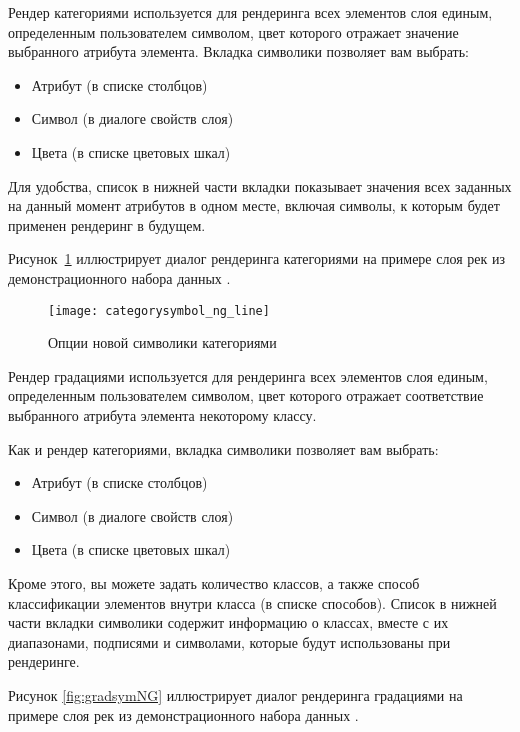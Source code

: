 
Рендер категориями используется для рендеринга всех элементов слоя единым,
определенным пользователем символом, цвет которого отражает значение выбранного
атрибута элемента. Вкладка символики позволяет вам выбрать:

\begin{itemize}[label=--]
\item Атрибут (в списке столбцов)
\item Символ (в диалоге свойств слоя)
\item Цвета (в списке цветовых шкал)
\end{itemize}

Для удобства, список в нижней части вкладки показывает значения всех заданных
на данный момент атрибутов в одном месте, включая символы, к которым
будет применен рендеринг в будущем.

Рисунок~\ref{fig:catsymNG} иллюстрирует диалог рендеринга категориями
на примере слоя рек из демонстрационного набора данных \qg.

\begin{figure}[ht]
   \centering
   \texttt{[image: categorysymbol\_ng\_line]}
   \caption{Опции новой символики категориями \wincaption}\label{fig:catsymNG}
\end{figure}


Рендер градациями используется для рендеринга всех элементов слоя единым,
определенным пользователем символом, цвет которого отражает соответствие
выбранного атрибута элемента некоторому классу.

Как и рендер категориями, вкладка символики позволяет вам выбрать:

\begin{itemize}[label=--]
\item Атрибут (в списке столбцов)
\item Символ (в диалоге свойств слоя)
\item Цвета (в списке цветовых шкал)
\end{itemize}

Кроме этого, вы можете задать количество классов, а также способ классификации
элементов внутри класса (в списке способов). Список в нижней части вкладки
символики содержит информацию о классах, вместе с их диапазонами, подписями
и символами, которые будут использованы при рендеринге.

Рисунок \ref{fig:gradsymNG} иллюстрирует диалог рендеринга градациями
на примере слоя рек из демонстрационного набора данных \qg.

